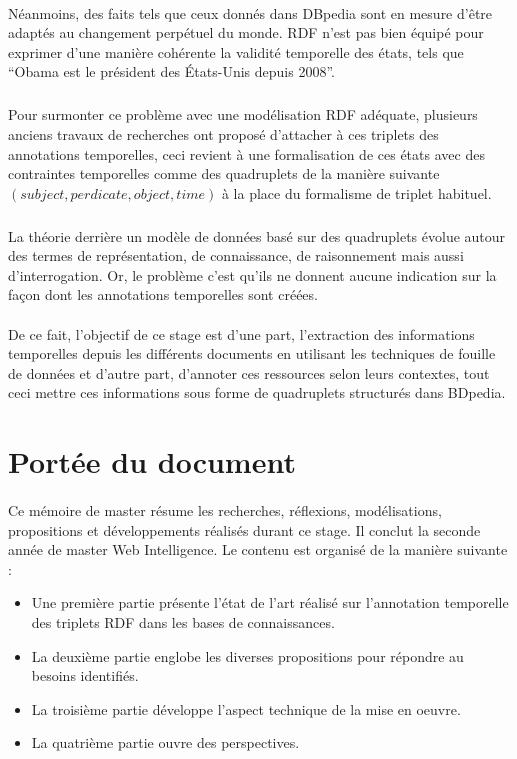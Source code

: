 \paragraph{}
Néanmoins, des faits tels que ceux donnés dans DBpedia sont en mesure d’être adaptés au changement perpétuel du monde.
RDF n’est pas bien équipé pour exprimer d’une manière cohérente la validité temporelle des états, tels que “Obama est le président des États-Unis depuis 2008”. 
\subparagraph{}
Pour surmonter ce problème avec une modélisation RDF adéquate, plusieurs anciens travaux de recherches ont proposé d’attacher à ces triplets des annotations temporelles, ceci revient à une formalisation de ces états avec des contraintes temporelles comme des quadruplets de la manière suivante $(subject, perdicate, object, time)$ à la place du formalisme de triplet habituel.
\subparagraph{}
La théorie derrière un modèle de données basé sur des quadruplets évolue autour des termes de représentation, de connaissance, de raisonnement mais aussi d’interrogation. Or, le problème c’est qu’ils ne donnent aucune indication sur la façon dont les annotations temporelles sont créées.
\paragraph{}
De ce fait, l’objectif de ce stage est d’une part, l’extraction des informations temporelles depuis les différents documents en utilisant les techniques de fouille de données et d’autre part, d’annoter ces ressources selon leurs contextes, tout ceci mettre ces informations sous forme de quadruplets structurés dans BDpedia.
\newpage
\section*{Portée du document }
\paragraph{}
Ce mémoire de master résume les recherches, réflexions, modélisations, propositions et développements réalisés durant ce stage. Il conclut la seconde année de master Web Intelligence. Le contenu est organisé de la manière suivante :
\begin{itemize}
\item Une première partie présente l’état de l’art réalisé sur l’annotation temporelle des triplets RDF dans les bases de connaissances.
\item La deuxième partie englobe les diverses propositions pour répondre au besoins identifiés.
\item La troisième partie développe l’aspect technique de la mise en oeuvre.
\item La quatrième partie ouvre des perspectives.
\end{itemize}